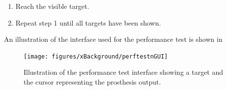 \begin{enumerate}
	\item Reach the visible target.
	\item Repeat step 1 until all targets have been shown.
\end{enumerate}

An illustration of the interface used for the performance test is shown in 

\begin{figure}[H]                 
	\texttt{[image: figures/xBackground/perftestnGUI]}  
	\caption{Illustration of the performance test interface showing a target and the cursor representing the prosthesis output.}
	\label{fig:perftestGUI} 
\end{figure}
%
%
